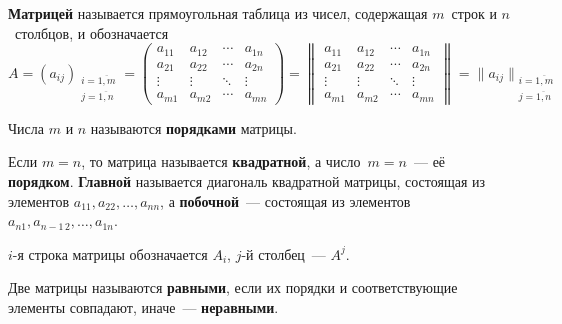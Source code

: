  \textbf{Матрицей} называется прямоугольная таблица из чисел, содержащая $m$~строк и $n$~столбцов, и обозначается
\begin{equation*}
A = (a_{ij})_{\begin{smallmatrix}
i = \overline{1, m} \\
j = \overline{1, n}
\end{smallmatrix}} =
\begin{pmatrix}
a_{11} & a_{12} & \cdots & a_{1n} \\
a_{21} & a_{22} & \cdots & a_{2n} \\
\vdots & \vdots & \ddots & \vdots \\
a_{m1} & a_{m2} & \cdots & a_{mn}
\end{pmatrix} =
\begin{Vmatrix}
a_{11} & a_{12} & \cdots & a_{1n} \\
a_{21} & a_{22} & \cdots & a_{2n} \\
\vdots & \vdots & \ddots & \vdots \\
a_{m1} & a_{m2} & \cdots & a_{mn}
\end{Vmatrix} =
\|a_{ij}\|_{\begin{smallmatrix}
i = \overline{1, m} \\
j = \overline{1, n}
\end{smallmatrix}}
\end{equation*}

Числа $m$ и $n$ называются \textbf{порядками} матрицы.

Если $m = n$, то матрица называется \textbf{квадратной}, а число~$m = n$~--- её \textbf{порядком}.
\textbf{Главной} называется диагональ квадратной матрицы, состоящая из элементов $a_{11}, a_{22}, \ldots, a_{nn}$, а \textbf{побочной}~--- состоящая из элементов $a_{n1}, a_{n-1\, 2}, \ldots, a_{1n}$.

$i$-я строка матрицы обозначается $A_i$, $j$-й столбец~--- $A^j$.

Две матрицы называются \textbf{равными}, если их порядки и соответствующие элементы совпадают, иначе~--- \textbf{неравными}.